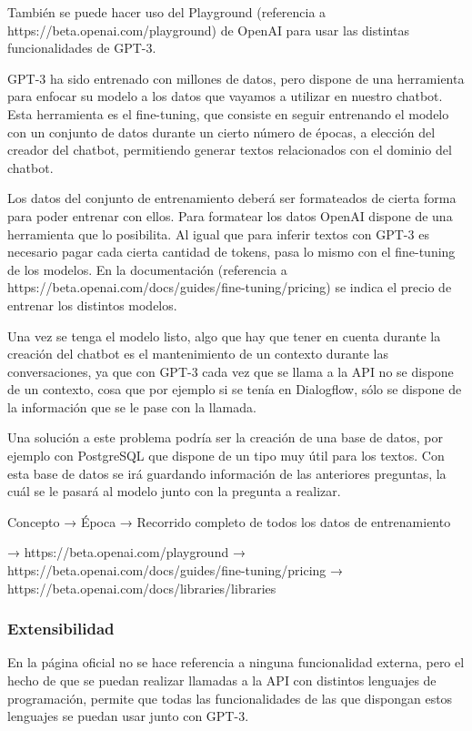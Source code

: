 También se puede hacer uso del Playground (referencia a https://beta.openai.com/playground) de OpenAI para usar las distintas funcionalidades de GPT-3.

GPT-3 ha sido entrenado con millones de datos, pero dispone de una herramienta para enfocar su modelo a los datos que vayamos a utilizar en nuestro chatbot. Esta herramienta es el fine-tuning, que consiste en seguir entrenando el modelo con un conjunto de datos durante un cierto número de épocas, a elección del creador del chatbot, permitiendo generar textos relacionados con el dominio del chatbot.

Los datos del conjunto de entrenamiento deberá ser formateados de cierta forma para poder entrenar con ellos. Para formatear los datos OpenAI dispone de una herramienta que lo posibilita. Al igual que para inferir textos con GPT-3 es necesario pagar cada cierta cantidad de tokens, pasa lo mismo con el fine-tuning de los modelos. En la documentación (referencia a https://beta.openai.com/docs/guides/fine-tuning/pricing) se indica el precio de entrenar los distintos modelos.

Una vez se tenga el modelo listo, algo que hay que tener en cuenta durante la creación del chatbot es el mantenimiento de un contexto durante las conversaciones, ya que con GPT-3 cada vez que se llama a la API no se dispone de un contexto, cosa que por ejemplo si se tenía en Dialogflow, sólo se dispone de la información que se le pase con la llamada.

Una solución a este problema podría ser la creación de una base de datos, por ejemplo con PostgreSQL que dispone de un tipo muy útil para los textos. Con esta base de datos se irá guardando información de las anteriores preguntas, la cuál se le pasará al modelo junto con la pregunta a realizar.





Concepto → Época → Recorrido completo de todos los datos de entrenamiento

→ https://beta.openai.com/playground
→ https://beta.openai.com/docs/guides/fine-tuning/pricing
→ https://beta.openai.com/docs/libraries/libraries

\subsubsection*{Extensibilidad}

En la página oficial no se hace referencia a ninguna funcionalidad externa, pero el hecho de que se puedan realizar llamadas a la API con distintos lenguajes de programación, permite que todas las funcionalidades de las que dispongan estos lenguajes se puedan usar junto con GPT-3.

